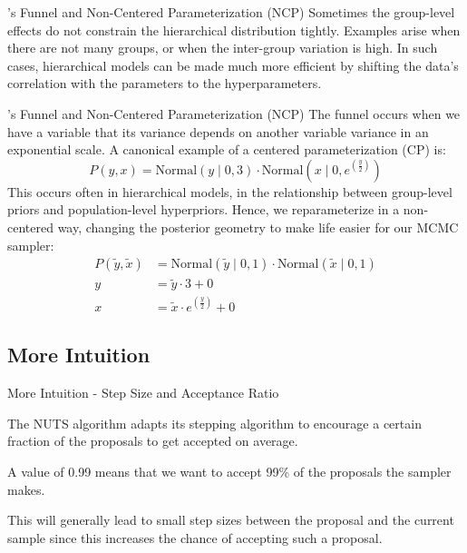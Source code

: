 \begin{frame}{\textcite{nealSliceSampling2003}'s Funnel and Non-Centered Parameterization (NCP)}
	Sometimes the group-level effects do not constrain the hierarchical distribution tightly.
	\vfill
	Examples arise when there are not many groups,
	or when the inter-group variation is high.
	\vfill
	In such cases, hierarchical models can be made much more efficient by shifting the
	data's correlation with the parameters to the hyperparameters.
\end{frame}

\begin{frame}{\textcite{nealSliceSampling2003}'s Funnel and Non-Centered Parameterization (NCP)}
	\small
	The funnel occurs when we have a variable that its variance depends on another variable variance
	in an exponential scale.
	A canonical example of a centered parameterization (CP) is:
	$$
		P(y,x) = \text{Normal}(y \mid 0 ,3) \cdot
		\text{Normal}\left(x \mid 0, e^{\left(\frac{y}{2}\right)}\right)
	$$
	This occurs often in hierarchical models,
	in the relationship between group-level priors and population-level hyperpriors.
	Hence, we reparameterize in a non-centered way,
	changing the posterior geometry to make life easier for our MCMC sampler:
	$$
		\begin{aligned}
			P(\tilde{y},\tilde{x}) & = \text{Normal}(\tilde{y} \mid 0, 1) \cdot
			\text{Normal}(\tilde{x} \mid 0, 1)                                           \\
			y                      & = \tilde{y} \cdot 3 + 0                             \\
			x                      & = \tilde{x} \cdot  e^{\left(\frac{y}{2}\right)} + 0
		\end{aligned}
	$$
\end{frame}

\subsection{More Intuition}
\begin{frame}{More Intuition - Step Size and Acceptance Ratio}
	\begin{vfilleditems}
		\item The NUTS algorithm adapts its stepping algorithm to encourage a certain fraction of the proposals to get accepted on average.
		\item A value of 0.99 means that we want to accept 99\% of the proposals the sampler makes.
		\item This will generally lead to small step sizes between the proposal and the current sample since this increases the chance of accepting such a proposal.
	\end{vfilleditems}
\end{frame}

